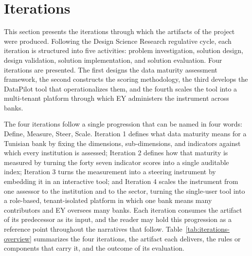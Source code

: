 
\section{Iterations}

This section presents the iterations through which the artifacts of the project were produced. Following the Design Science Research regulative cycle, each iteration is structured into five activities: problem investigation, solution design, design validation, solution implementation, and solution evaluation. Four iterations are presented. The first designs the data maturity assessment framework, the second constructs the scoring methodology, the third develops the DataPilot tool that operationalizes them, and the fourth scales the tool into a multi-tenant platform through which EY administers the instrument across banks.

The four iterations follow a single progression that can be named in four words: Define, Measure, Steer, Scale. Iteration 1 defines what data maturity means for a Tunisian bank by fixing the dimensions, sub-dimensions, and indicators against which every institution is assessed; Iteration 2 defines how that maturity is measured by turning the forty seven indicator scores into a single auditable index; Iteration 3 turns the measurement into a steering instrument by embedding it in an interactive tool; and Iteration 4 scales the instrument from one assessor to the institution and to the sector, turning the single-user tool into a role-based, tenant-isolated platform in which one bank means many contributors and EY oversees many banks. Each iteration consumes the artifact of its predecessor as its input, and the reader may hold this progression as a reference point throughout the narratives that follow. Table~\ref{tab:iterations-overview} summarizes the four iterations, the artifact each delivers, the rules or components that carry it, and the outcome of its evaluation.

